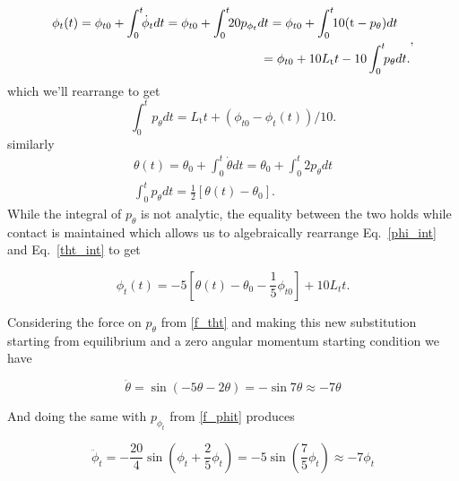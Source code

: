 \documentclass[prbg,preprint]{revtex4-1}
\begin{document}
\begin{equation}
  \begin{multlined}
	\phi_t(t) 
	= \phi_{t0} + \int_0^t \kern-.33em  \dot \phi_t  dt
	= \phi_{t0} + \int_0^t \kern-.33em 20 p_{ \phi_t } dt
	= \phi_{t0} + \int_0^t \kern-.33em 10 (\textrm{t}-p_{ \theta }) dt
	\\
	= \phi_{t0} + 10L_\textrm{t} t -10 \int_0^t \kern-.33em p_{ \theta } dt.
  \end{multlined},
\end{equation}
which we'll rearrange to get
\begin{equation}\label{phi_int}
	\int_0^t  p_{ \theta } dt
	= L_\textrm{t} t + (\phi_{t0}  - \phi_t(t))/10.
\end{equation}
similarly
\begin{equation}\label{tht_int}
  \begin{multlined}
	\theta(t) 
	= \theta_{ 0} + \int_0^t  \dot \theta  dt
	= \theta_{ 0} + \int_0^t  2 p_{\theta} dt
	\\
	\int_0^t  p_{\theta} dt = \frac{1}{2}[\theta(t)-\theta_{0}].
  \end{multlined}
\end{equation}
While the integral of $p_\theta$ is not analytic, the equality between the two holds while contact is maintained which allows us to algebraically rearrange Eq.~\ref{phi_int} and Eq.~\ref{tht_int} to get

\begin{equation}
	\phi_t(t)=  -5
	\left[
	\theta(t)-\theta_{0}-\frac{1}{5}\phi_{t0}
	\right] 
	+ 10L_t t .
\end{equation}

Considering the force on $p_\theta$ from \ref{f_tht} and making this new substitution starting from equilibrium and a zero angular momentum starting condition we have

\begin{equation}
	\ddot \theta = \sin(-5\theta -2\theta) = -\sin 7\theta \approx -7\theta
\end{equation}

And doing the same with $p_{\phi_t}$ from \ref{f_phit} produces

\begin{equation}
	\ddot \phi_t = -\frac{20}{4}\sin(\phi_t +\frac{2}{5}\phi_t) =  -5\sin\left ( \frac{7}{5}\phi_t \right )\approx -7\phi_t
\end{equation}
\end{document}
